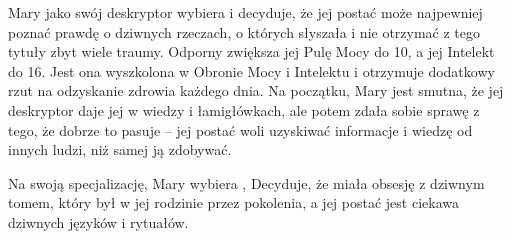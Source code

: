 Mary jako swój deskryptor wybiera   i decyduje, że jej postać może najpewniej poznać prawdę o dziwnych rzeczach, o których słyszała i nie otrzymać z tego tytuły zbyt wiele traumy. Odporny zwiększa jej Pulę Mocy do 10, a jej Intelekt do 16. Jest ona wyszkolona w Obronie Mocy i Intelektu i otrzymuje dodatkowy rzut na odzyskanie zdrowia każdego dnia. Na początku, Mary jest smutna, że jej deskryptor daje jej   w wiedzy i łamigłówkach, ale potem zdała sobie sprawę z tego, że dobrze to pasuje – jej postać woli uzyskiwać informacje i wiedzę od innych ludzi, niż samej ją zdobywać. 

Na swoją specjalizację, Mary wybiera  , Decyduje, że miała obsesję z dziwnym tomem, który był w jej rodzinie przez pokolenia, a jej postać jest ciekawa dziwnych języków i rytuałów.